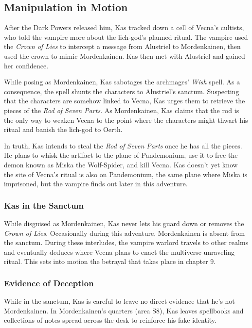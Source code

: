\documentclass[10pt,a4paper,twoside,bg=print,twocolumn,openany,nodeprecatedcode]{dndbook}
\begin{document}
\subsection{Manipulation in Motion}
After the Dark Powers released him, Kas tracked down a cell of Vecna's cultists, who told the vampire more about the lich-god's planned ritual. The vampire used the \textit{Crown of Lies} to intercept a message from Alustriel to Mordenkainen, then used the crown to mimic Mordenkainen. Kas then met with Alustriel and gained her confidence.

While posing as Mordenkainen, Kas sabotages the archmages' \textit{Wish} spell. As a consequence, the spell shunts the characters to Alustriel's sanctum. Suspecting that the characters are somehow linked to Vecna, Kas urges them to retrieve the pieces of the \textit{Rod of Seven Parts}. As Mordenkainen, Kas claims that the rod is the only way to weaken Vecna to the point where the characters might thwart his ritual and banish the lich-god to Oerth.

In truth, Kas intends to steal the \textit{Rod of Seven Parts} once he has all the pieces. He plans to whisk the artifact to the plane of Pandemonium, use it to free the demon known as Miska the Wolf-Spider, and kill Vecna. Kas doesn't yet know the site of Vecna's ritual is also on Pandemonium, the same plane where Miska is imprisoned, but the vampire finds out later in this adventure.

\subsubsection{Kas in the Sanctum}
While disguised as Mordenkainen, Kas never lets his guard down or removes the \textit{Crown of Lies}. Occasionally during this adventure, Mordenkainen is absent from the sanctum. During these interludes, the vampire warlord travels to other realms and eventually deduces where Vecna plans to enact the multiverse-unraveling ritual. This sets into motion the betrayal that takes place in chapter 9.

\subsubsection{Evidence of Deception}
While in the sanctum, Kas is careful to leave no direct evidence that he's not Mordenkainen. In Mordenkainen's quarters (area S8), Kas leaves spellbooks and collections of notes spread across the desk to reinforce his fake identity.
\end{document}
